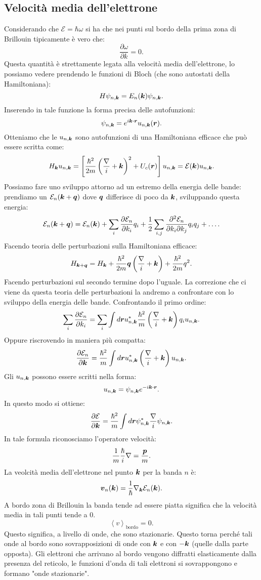 \subsection{Velocità media dell'elettrone}
\label{subsec:Velocità media dell'elettrone}
Considerando che $\mathcal{E}  = \hbar \omega $ si ha che nei punti sul bordo della prima zona di Brillouin tipicamente è vero che: 
\[
	\frac{\partial \omega }{\partial k} = 0
.\] 
Questa quantità è strettamente legata alla velocità media dell'elettrone, lo possiamo vedere prendendo le funzioni di Bloch (che sono autostati della Hamiltoniana):
\[
	H\psi_{n,\boldsymbol{k}} = E_n(\boldsymbol{k})\psi_{n,\boldsymbol{k}}
.\] 
Inserendo in tale funzione la forma precisa delle autofunzioni:
\[
	\psi_{n,\boldsymbol{k}} = e^{i\boldsymbol{k}\cdot\boldsymbol{r}} u_{n,\boldsymbol{k}}(\boldsymbol{r})
.\] 
Otteniamo che le $u_{n,\boldsymbol{k}}$ sono autofunzioni di una Hamiltoniana efficace che può essere scritta come:
\[
	H_{\boldsymbol{k}} u_{n,\boldsymbol{k}} = 
	\left[ \frac{\hbar ^2}{2m}\left( \frac{\nabla}{i} + \boldsymbol{k} \right)^2 
	+U_c(\boldsymbol{r})\right] u_{n,\boldsymbol{k}} = \mathcal{E}(\boldsymbol{k})u_{n,\boldsymbol{k}}
.\] 
Possiamo fare uno sviluppo attorno ad un estremo della energia delle bande: prendiamo un $\mathcal{E}_n(\boldsymbol{k}+\boldsymbol{q})$ dove $\boldsymbol{q}$ differisce di poco da $\boldsymbol{k}$, sviluppando questa energia:
\[
	\mathcal{E}_n(\boldsymbol{k}+\boldsymbol{q}) =
	\mathcal{E}_n(\boldsymbol{k})+
	\sum_{i}^{} \frac{\partial \mathcal{E}_n}{\partial k_i} q_i +
	\frac{1}{2}\sum_{i,j}^{} \frac{\partial ^2 \mathcal{E}_n}
	{\partial k_i \partial  k_j} q_i q_j+ \ldots
.\] 
Facendo teoria delle perturbazioni sulla Hamiltoniana efficace:
\[
	H_{\boldsymbol{k}+\boldsymbol{q}}
	=
	H_{\boldsymbol{k}} +
	\frac{\hbar ^2}{2m}\boldsymbol{q}\left( \frac{\nabla}{i}+\boldsymbol{k} \right) 
	+
	\frac{\hbar ^2}{2m} q^2
.\]
Facendo perturbazioni sul secondo termine dopo l'uguale. La correzione che ci viene da questa teoria delle perturbazioni la andremo a confrontare con lo sviluppo della energia delle bande. Confrontando il primo ordine:
\[
	\sum_{i}^{} \frac{\partial \mathcal{E}_n}{\partial k_i}=
	\sum_{i}^{} \int d\boldsymbol{r} u_{n,\boldsymbol{k}}^* \frac{\hbar ^2}{m}
	\left( \frac{\nabla}{i} + \boldsymbol{k} \right) q_i u_{n,\boldsymbol{k}}
.\] 
Oppure riscrovendo in maniera più compatta:
\[
	\frac{\partial \mathcal{E}_n}{\partial \boldsymbol{k}} =
	\frac{\hbar ^2}{m} \int d \boldsymbol{r} u_{n,\boldsymbol{k}}^* 
	\left( \frac{\nabla}{i} + \boldsymbol{k} \right) u_{n,\boldsymbol{k}}
.\] 
Gli $u_{n,\boldsymbol{k}}$ possono essere scritti nella forma:
\[
	u_{n,\boldsymbol{k}} = \psi_{n,\boldsymbol{k}} e^{-i \boldsymbol{k}\cdot\boldsymbol{r}}
.\] 
In questo modo si ottiene:
\[
	\frac{\partial \mathcal{E}}{\partial \boldsymbol{k}} =
	\frac{\hbar ^2}{m} \int d \boldsymbol{r} \psi_{n,\boldsymbol{k}}^* \frac{\nabla}{i} \psi_{n,\boldsymbol{k}}
.\]
In tale formula riconosciamo l'operatore velocità:
\[
	\frac{1}{m} \frac{\hbar }{i}\nabla  = \frac{\boldsymbol{p}}{m}
.\]
La veolcità media dell'elettrone nel punto $\boldsymbol{k}$ per la banda $n$ è:
\[
	\boldsymbol{v}_n(\boldsymbol{k}) =
	\frac{1}{\hbar } \nabla_{\boldsymbol{k}} \mathcal{E}_n (\boldsymbol{k})
.\] 
A bordo zona di Brillouin la banda tende ad essere piatta significa che la velocità media in tali punti tende a 0. 
\[
	\left< v \right>_\text{bordo} = 0
.\] 
Questo significa, a livello di onde, che sono stazionarie. Questo torna perché tali onde al bordo sono sovrapposizioni di onde con $\boldsymbol{k}$ e con $-\boldsymbol{k}$ (quelle dalla parte opposta). Gli elettroni che arrivano al bordo vengono diffratti elasticamente dalla presenza del reticolo, le funzioni d'onda di tali elettroni si sovrappongono e formano "onde stazionarie".
